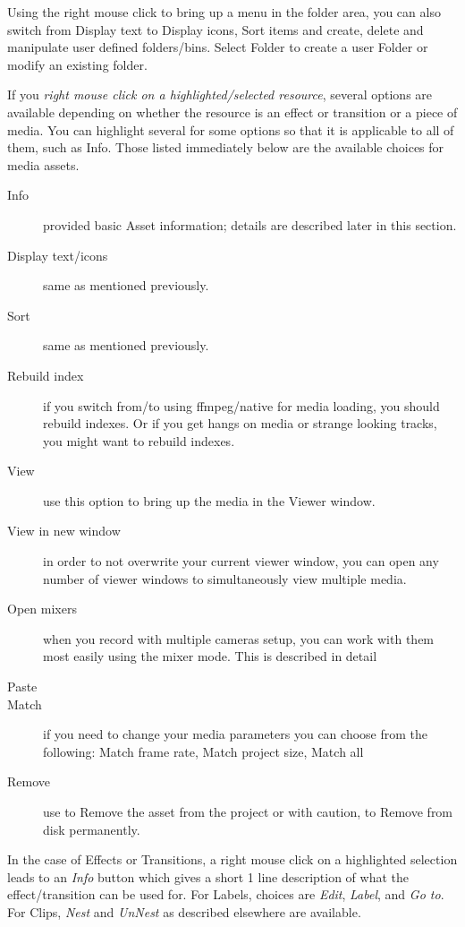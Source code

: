 Using the right mouse click to bring up a menu in the folder area, you can also switch from Display text to Display icons, Sort items and create, delete and manipulate user defined folders/bins. Select Folder to create a user Folder or modify an existing folder.

If you \textit{right mouse click on a highlighted/selected resource}, several options are available depending on whether the resource is an effect or transition or a piece of media.  
You can highlight several for some options so that it is applicable to all of them, such as Info.  
Those listed immediately below are the available choices for media assets.


\begin{description}
    \item[Info]  provided basic Asset information; details are described later in this section.
    \item[Display text/icons]  same as mentioned previously.
    \item[Sort]  same as mentioned previously.
    \item[Rebuild index] if you switch from/to using ffmpeg/native for media loading, you should rebuild
        indexes.  Or if you get hangs on media or strange looking tracks, you might want to rebuild indexes.
    \item[View]  use this option to bring up the media in the Viewer window.
    \item[View in new window]  in order to not overwrite your current viewer window, you can open any
        number of viewer windows to simultaneously view multiple media.
    \item[Open mixers]  when you record with multiple cameras setup, you can work with them most easily
        using the mixer mode.  This is described in detail
    \item[Paste]  
    \item[Match]  if you need to change your media parameters you can choose from the following: Match frame
        rate, Match project size, Match all 
    \item[Remove]  use to Remove the asset from the project or with caution, to Remove from disk permanently.
\end{description}

In the case of Effects or Transitions, a right mouse click on a highlighted selection leads to an \emph{Info} button which gives a short 1 line description of what the effect/transition can be used for.
For Labels, choices are \emph{Edit}, \emph{Label}, and \emph{Go to}.
For Clips, \emph{Nest} and \emph{UnNest} as described elsewhere are available.

